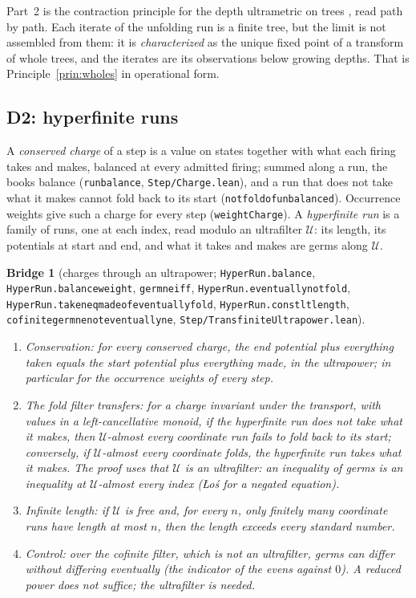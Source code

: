 \documentclass[]{article}
\newtheorem{bridge}[theorem]{Bridge}
\theoremstyle{definition}
\theoremstyle{remark}
\newcommand{\codeus}{\textunderscore\allowbreak}
\newcommand{\code}[1]{\texttt{\let\_\codeus #1}}
\newcommand{\lpath}[1]{{\ttfamily\nolinkurl{#1}}}
\newcommand{\Uf}{\mathcal{U}}
\newcommand{\step}[1]{\lpath{Step/#1.lean}}
\begin{document}
Part~2 is the contraction principle for the depth ultrametric on trees \cite{ArnoldNivat1980}, read path
by path. Each iterate of the unfolding run is a finite tree, but the limit is not assembled from them:
it is \emph{characterized} as the unique fixed point of a transform of whole trees, and the iterates
are its observations below growing depths. That is Principle~\ref{prin:wholes} in operational form.

\subsection{D2: hyperfinite runs}
\label{sec:hyperrun}

A \emph{conserved charge} of a step is a value on states together with what each firing takes and
makes, balanced at every admitted firing; summed along a run, the books balance (\code{run\_balance},
\step{Charge}), and a run that does not take what it makes cannot fold back to its start
(\code{not\_fold\_of\_unbalanced}). Occurrence weights give such a charge for every step
(\code{weightCharge}). A \emph{hyperfinite run} is a family of runs, one at each index, read modulo an
ultrafilter $\Uf$: its length, its potentials at start and end, and what it takes and makes are germs
along $\Uf$.

\begin{bridge}[charges through an ultrapower; \code{HyperRun.balance}, \code{HyperRun.balance\_weight},
\code{germ\_ne\_iff}, \code{HyperRun.eventually\_not\_fold}, \code{HyperRun.taken\_eq\_made\_of\_eventually\_fold},
\code{HyperRun.const\_lt\_length}, \code{cofinite\_germ\_ne\_not\_eventually\_ne}, \step{TransfiniteUltrapower}]
\label{thm:hyperrun}
\leavevmode
\begin{enumerate}
\item \emph{Conservation}: for every conserved charge, the end potential plus everything taken equals
  the start potential plus everything made, in the ultrapower; in particular for the occurrence
  weights of every step.
\item \emph{The fold filter transfers}: for a charge invariant under the transport, with values in a
  left-cancellative monoid, if the hyperfinite run does not take what it makes, then
  $\Uf$-almost every coordinate run fails to fold back to its start; conversely, if $\Uf$-almost every
  coordinate folds, the hyperfinite run takes what it makes. The proof uses that $\Uf$ is an
  ultrafilter: an inequality of germs is an inequality at $\Uf$-almost every index ({\L}o\'s for a
  negated equation).
\item \emph{Infinite length}: if $\Uf$ is free and, for every $n$, only finitely many coordinate runs
  have length at most $n$, then the length exceeds every standard number.
\item \emph{Control}: over the cofinite filter, which is not an ultrafilter, germs can differ without
  differing eventually (the indicator of the evens against $0$). A reduced power does not suffice;
  the ultrafilter is needed.
\end{enumerate}
\end{bridge}
\end{document}
